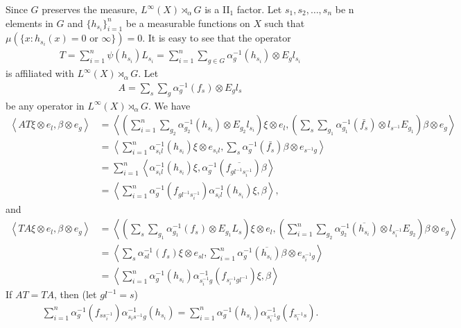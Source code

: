\documentclass[a4paper,10pt]{amsart}
\begin{document}
Since $G$ preserves the measure, $L^{\infty}(X) \rtimes_{\alpha} G$ is a II$_1$
factor. Let $s_1, s_2, \ldots, s_n$ be n elements in $G$ and 
$\{h_{s_i} \}_{i = 1}^{n}$ be a measurable functions on $X$ such that 
$\mu(\{x : h_{s_i}(x) = 0 \mbox{ or } \infty \}) = 0$.
It is easy to see that the operator
\begin{align*}
    T = \sum_{i = 1}^{n} \psi(h_{s_i})L_{s_i} =
    \sum_{i = 1}^{n} \sum_{g \in G} \alpha_{g}^{-1}(h_{s_i}) \otimes E_{g}l_{s_i}
\end{align*}
is affiliated with $L^{\infty}(X) \rtimes_{\alpha} G$. Let 
\begin{align*}
    A = \sum_{s} \sum_{g} \alpha_{g}^{-1}(f_{s}) \otimes E_{g}l_{s}
\end{align*}
be any operator in $L^{\infty}(X) \rtimes_{\alpha} G$. We have
\begin{align*}
\left\langle AT \xi \otimes e_l, \beta \otimes e_g \right \rangle &=
    \left\langle (\sum_{i=1}^{n} \sum_{g_2} \alpha_{g_2}^{-1}(h_{s_i}) \otimes
    E_{g_2}l_{s_i})\xi \otimes e_l, (\sum_{s} \sum_{g_1} \alpha_{g_1}^{-1}
    (\bar{f_{s}})
\otimes l_{s^{-1}}E_{g_1}) \beta \otimes e_g \right \rangle \\ 
&= \left\langle \sum_{i=1}^{n} \alpha_{s_{i}l}^{-1}(h_{s_i})\xi \otimes e_{s_{i}l}, 
\sum_{s} \alpha_{g}^{-1}(\bar{f_s})\beta \otimes e_{s^{-1}g} \right \rangle \\
&= \sum_{i=1}^{n}\left\langle \alpha_{s_{i}l}^{-1}(h_{s_i})\xi,
\alpha_{g}^{-1}(\overline{f_{gl^{-1}s_{i}^{-1}}})\beta \right \rangle \\
&= \left\langle \sum_{i=1}^{n}
\alpha_{g}^{-1}(f_{gl^{-1}s_{i}^{-1}})\alpha_{s_{i}l}^{-1}(h_{s_i})\xi, \beta \right
\rangle,
\end{align*}
and
\begin{align*}
\left\langle TA \xi \otimes e_l, \beta \otimes e_g \right \rangle &=
\left\langle 
(\sum_{s} \sum_{g_1} \alpha_{g_1}^{-1}(f_{s}) \otimes E_{g_1}L_{s}) \xi \otimes e_l,
(\sum_{i=1}^{n}\sum_{g_2} \alpha_{g_2}^{-1}(\overline{h_{s_i}}) \otimes
l_{s_{i}^{-1}}E_{g_2}) \beta \otimes e_{g} \right \rangle \\ 
&= \left \langle \sum_{s} \alpha_{sl}^{-1}(f_{s})\xi \otimes e_{sl},
\sum_{i=1}^{n}\alpha_{g}^{-1}(\overline{h_{s_i}})\beta \otimes e_{s_{i}^{-1}g} \right
\rangle\\ 
& = \left \langle
\sum_{i=1}^{n} \alpha_{g}^{-1}(h_{s_i})\alpha_{s_{i}^{-1}g}^{-1}(f_{s_{i}^{-1}gl^{-1}}) 
\xi,
\beta \right \rangle
\end{align*}
If $AT = TA$, then (let $gl^{-1} = s$)
\begin{align}\label{eq1}
    \sum_{i=1}^{n}\alpha_{g}^{-1}(f_{ss_{i}^{-1}})\alpha_{s_{i}s^{-1}g}^{-1}
    (h_{s_i}) =
    \sum_{i=1}^{n}\alpha_{g}^{-1}(h_{s_i})\alpha_{s^{-1}_{i}g}^{-1}(f_{s_{i}^{-1}s}).
\end{align}
\end{document}
